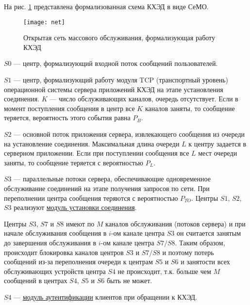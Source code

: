 \vspace{\baselineskip}
На рис. \ref{img:net} представлена формализованная схема КХЭД в виде СеМО.

\begin{figure}[h]
  \centering
  \texttt{[image: net]}
  \caption{Открытая сеть массового обслуживания, формализующая работу КХЭД}
  \label{img:net}
\end{figure}

$S0$ --- центр, формализующий входной поток сообщений пользователей.

\vspace{\baselineskip}
$S1$ --- центр, формализующий работу модуля TCP (транспортный уровень) операционной системы сервера приложений КХЭД на этапе установления соединения. $K$ --- число обслуживающих каналов, очередь отсутствует. Если в момент поступления сообщения в центр все $K$ каналов заняты, то сообщение теряется, вероятность этого события равна $P_B$.

\vspace{\baselineskip}
$S2$ --- основной поток приложения сервера, извлекающего сообщения из очереди на установление соединения. Максимальная длина очереди $L$ к центру задается в серверном приложении. Если при поступлении сообщения все $L$ мест очереди заняты, то сообщение теряется с вероятностью $P_L$.

\vspace{\baselineskip}
$S3$ --- параллельные потоки сервера, обеспечивающие одновременное обслуживание соединений на этапе получения запросов по сети. При переполнении центра сообщения теряются с вероятностью $P_{TO}$.
Центры $S1$, $S2$, $S3$ реализуют \underline{модуль установки соединения}.

\vspace{\baselineskip}
Центры $S3$, $S7$ и $S8$ имеют по $M$ каналов обслуживания (потоков сервера) и при начале обслуживания сообщения в $i$-ом канале центра $S3$ он считается занятым до завершения обслуживания в $i$-ом канале центра $S7/S8$. Таким образом, происходит блокировка каналов центров $S3$ и $S7/S8$ и поэтому потерь сообщений из-за переполнения очереди к центрам $S5$ и $S6$ и занятости всех обслуживающих устройств центра $S4$ не происходит, т.к. больше чем $M$ сообщений в центрах $S4$, $S5$ и $S6$ быть не может.

\vspace{\baselineskip}
$S4$ --- \underline{модуль аутентификации} клиентов при обращении к КХЭД.

